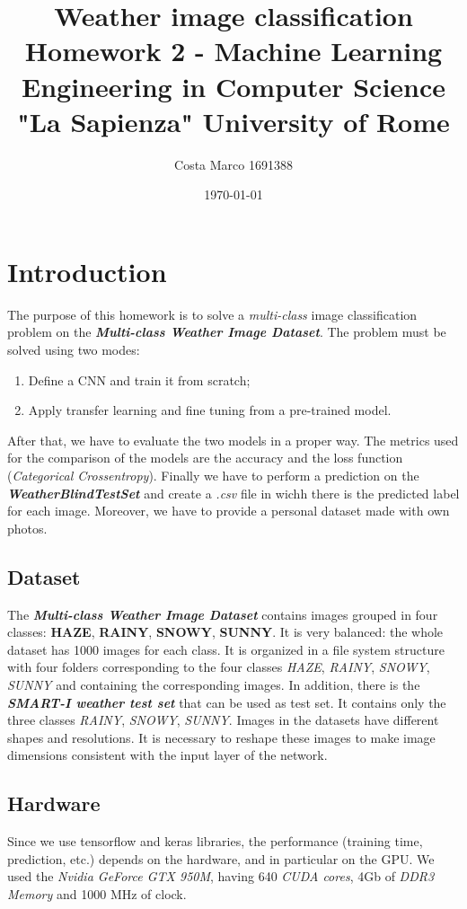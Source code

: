 \documentclass[11pt]{article}
\title{\textbf{Weather image classification} \\ \bigskip \large Homework 2 - Machine Learning \\ Engineering in Computer Science \\ "La Sapienza" University of Rome}
\author{Costa Marco 1691388}
\date{\today}
\begin{document}
\maketitle
\pagebreak
\tableofcontents
\pagebreak

\section{Introduction}
The purpose of this homework is to solve a \textit{multi-class} image classification problem on the \textbf{\textit{Multi-class Weather Image Dataset}}. The problem must be solved using two modes:
\begin{enumerate}
	\item Define a CNN and train it from scratch;
	\item Apply transfer learning and fine tuning from a pre-trained model.
\end{enumerate}
After that, we have to evaluate the two models in a proper way. The metrics used for the comparison of the models are the accuracy and the loss function (\textit{Categorical Crossentropy}).
Finally we have to perform a prediction on the \textbf{\textit{WeatherBlindTestSet}} and create a \textit{.csv} file in wichh there is the predicted label for each image.
Moreover, we have to provide a personal dataset made with own photos. 


\subsection{Dataset}
The \textbf{\textit{Multi-class Weather Image Dataset}} contains images grouped in four classes: \textbf{HAZE}, \textbf{RAINY}, \textbf{SNOWY}, \textbf{SUNNY}.
It is very balanced: the whole dataset has 1000 images for each class.
It is organized in a file system structure with four folders corresponding to the four classes \textit{HAZE}, \textit{RAINY}, \textit{SNOWY}, \textit{SUNNY} and containing the corresponding images.
In addition, there is the \textbf{\textit{SMART-I weather test set}} that can be used as test set. It contains only the three classes \textit{RAINY}, \textit{SNOWY}, \textit{SUNNY}. 
Images in the datasets have different shapes and resolutions. It is necessary to reshape these images to make image dimensions consistent with the input layer of the network.

\subsection{Hardware}
Since we use tensorflow and keras libraries, the performance (training time, prediction, etc.) depends on the hardware, and in particular on the GPU. We used the \textit{Nvidia GeForce GTX 950M}, having 640 \textit{CUDA cores}, 4Gb of \textit{DDR3 Memory} and 1000 MHz of clock.
\end{document}
